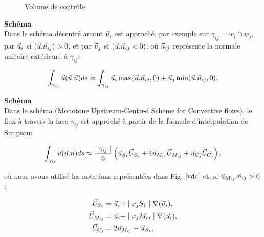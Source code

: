 \begin{appendix}
\begin{figure}[h!]
\caption{Volume de contr\^ole}
\label{vdc}
\end{figure}

{\bf{Sch\'ema  {}}}\\

Dans le sch\'ema d\'ecentr\'e amont $\velocity_i$ est approch\'e, par exemple sur $\gamma_{ij} = w_i  \cap w_j$, par $\velocity_i$ si $(\velocity . \normal_{ij} ) > 0 $, et par $\velocity_j$ si $(\velocity . \normal_{ij} <0)$, o\`u  $\normal_{ij}$ repr\'esente la normale unitaire ext\'erieure \`a $\gamma_{ij}$:

$$\int_{\gamma_{ij}} \velocity (\velocity . \normal ) ds \approx \int_{\gamma_{ij}} \velocity_i \max(\velocity . \normal_{ij}, 0) + \velocity_j \min(\velocity . \normal_{ij}, 0). $$ 


{\bf{Sch\'ema  {}}}\\



Dans le sch\'ema {}  (Monotone Upstream-Centred Scheme for Convective flows), le flux \`a travers la face $\gamma_{ij}$ est approch\'e \`a partir de la formule d'interpolation de Simpson:


$$\int_{\gamma_{ij}} \velocity (\velocity . \normal ) ds \approx \frac{ \mid  \gamma_{ij} \mid}{6}  \left( \velocity_{S_1} \vect{U}_{S_1}  + 4 \velocity_{M_{ij}} \vect{U}_{M_{ij}} +   \velocity_{C_j} \vect{U}_{C_j} \right), $$

o\`u nous avons utilis\'e les notations repr\'esent\'ees dans Fig. $\ref{vdc}$ et, si $\velocity_{M_{ij}} .  \normal_{ij} > 0$ :

\begin{align*}
\vect{U}_{S_1} &=  \velocity_{i} + \mid x_j S_1 \mid  \nabla(\velocity_i) ,\\
\vect{U}_{M_{ij}} &=  \velocity_{i} + \mid x_j M_{ij} \mid \nabla(\velocity_{i}) , \\
\vect{U}_{C_j} &= 2 \velocity_{M_{ij}} - \velocity_{S_1} ,\\
\end{align*}


\end{appendix}
